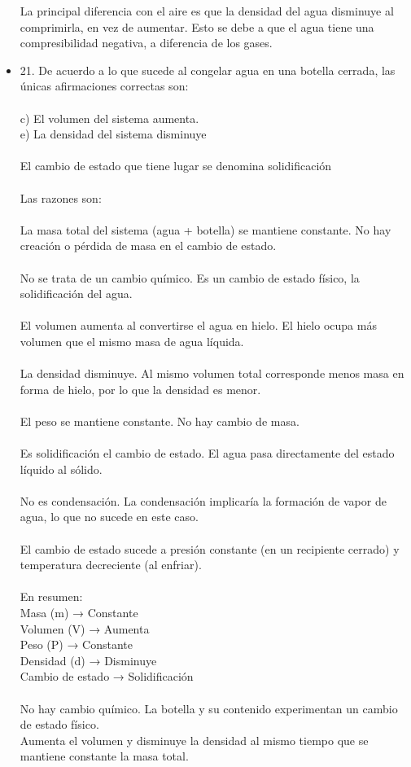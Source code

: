 \documentclass{article}
\begin{document}
\begin{itemize}
La principal diferencia con el aire es que la densidad del agua disminuye al comprimirla, en vez de aumentar. Esto se debe a que el agua tiene una compresibilidad negativa, a diferencia de los gases.
\item{21.}
De acuerdo a lo que sucede al congelar agua en una botella cerrada, las únicas afirmaciones correctas son:\\
\\
c) El volumen del sistema aumenta.\\
e) La densidad del sistema disminuye\\
\\
El cambio de estado que tiene lugar se denomina solidificación\\
\\
Las razones son:\\
\\
La masa total del sistema (agua + botella) se mantiene constante. No hay creación o pérdida de masa en el cambio de estado.\\
\\
No se trata de un cambio químico. Es un cambio de estado físico, la solidificación del agua.\\
\\
El volumen aumenta al convertirse el agua en hielo. El hielo ocupa más volumen que el mismo masa de agua líquida.\\
\\
La densidad disminuye. Al mismo volumen total corresponde menos masa en forma de hielo, por lo que la densidad es menor.\\
\\
El peso se mantiene constante. No hay cambio de masa.\\
\\
Es solidificación el cambio de estado. El agua pasa directamente del estado líquido al sólido.\\
\\
No es condensación. La condensación implicaría la formación de vapor de agua, lo que no sucede en este caso.\\
\\
El cambio de estado sucede a presión constante (en un recipiente cerrado) y temperatura decreciente (al enfriar).\\
\\
En resumen:\\
Masa (m) → Constante\\
Volumen (V) → Aumenta\\
Peso (P) → Constante\\
Densidad (d) → Disminuye\\
Cambio de estado → Solidificación\\
\\
No hay cambio químico. La botella y su contenido experimentan un cambio de estado físico.\\
Aumenta el volumen y disminuye la densidad al mismo tiempo que se mantiene constante la masa total.\\
\end{itemize}
\end{document}
